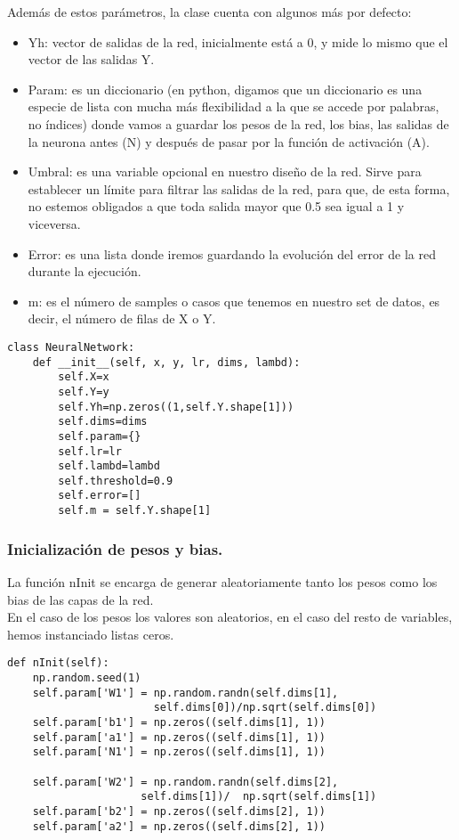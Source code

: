 \documentclass[a4paper,11pt]{article}
\begin{document}
\noindent
Además de estos parámetros, la clase cuenta con algunos más por defecto:
\begin{itemize}
    \item Yh: vector de salidas de la red, inicialmente está a 0, y mide lo mismo que el vector de las salidas Y.
    \item Param: es un diccionario (en python, digamos que un diccionario es una especie de lista con mucha más flexibilidad a la que se accede por palabras, no índices) donde vamos a guardar los pesos de la red, los bias, las salidas de la neurona antes (N) y después de pasar por la función de activación (A).
    \item Umbral: es una variable opcional en nuestro diseño de la red. Sirve para establecer un límite para filtrar las salidas de la red, para que, de esta forma, no estemos obligados a que toda salida mayor que 0.5 sea igual a 1 y viceversa.
    \item Error: es una lista donde iremos guardando la evolución del error de la red durante la ejecución.
    \item m: es el número de samples o casos que tenemos en nuestro set de datos, es decir, el número de filas de X o Y.
\end{itemize}
\begin{lstlisting}
class NeuralNetwork:
    def __init__(self, x, y, lr, dims, lambd):
        self.X=x
        self.Y=y
        self.Yh=np.zeros((1,self.Y.shape[1]))
        self.dims=dims
        self.param={}
        self.lr=lr
        self.lambd=lambd
        self.threshold=0.9
        self.error=[]
        self.m = self.Y.shape[1]
\end{lstlisting}
\subsubsection{Inicialización de pesos y bias.}

La función nInit se encarga de generar aleatoriamente tanto los pesos como los bias de las capas de la red.\\
En el caso de los pesos los valores son aleatorios, en el caso del resto de variables, hemos instanciado listas ceros.
\begin{lstlisting}
def nInit(self): 
    np.random.seed(1)
    self.param['W1'] = np.random.randn(self.dims[1],  
                       self.dims[0])/np.sqrt(self.dims[0]) 
    self.param['b1'] = np.zeros((self.dims[1], 1))   
    self.param['a1'] = np.zeros((self.dims[1], 1))        
    self.param['N1'] = np.zeros((self.dims[1], 1))             
     
    self.param['W2'] = np.random.randn(self.dims[2],
                     self.dims[1])/  np.sqrt(self.dims[1]) 
    self.param['b2'] = np.zeros((self.dims[2], 1))     
    self.param['a2'] = np.zeros((self.dims[2], 1))   
      
\end{lstlisting}
\end{document}
